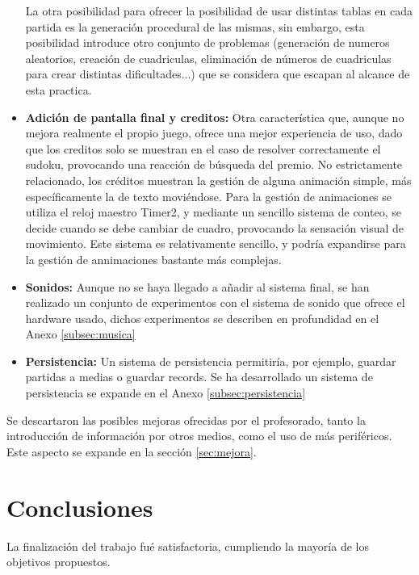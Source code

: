 \documentclass[12pt,letterpaper]{article}
\begin{document}
\begin{itemize}
    La otra posibilidad para ofrecer la posibilidad de usar distintas
    tablas en cada partida es la generación procedural de las mismas,
    sin embargo, esta posibilidad introduce otro conjunto de problemas
    (generación de numeros aleatorios, creación de cuadriculas,
    eliminación de números de cuadriculas para crear distintas
    dificultades...)  que se considera que escapan al alcance de esta
    practica.
  \item \textbf{Adición de pantalla final y creditos:} Otra
    característica que, aunque no mejora realmente el propio juego,
    ofrece una mejor experiencia de uso, dado que los creditos solo se
    muestran en el caso de resolver correctamente el sudoku,
    provocando una reacción de búsqueda del premio. No estrictamente
    relacionado, los créditos muestran la gestión de alguna animación
    simple, más específicamente la de texto moviéndose. Para la
    gestión de animaciones se utiliza el reloj maestro Timer2, y
    mediante un sencillo sistema de conteo, se decide cuando se debe
    cambiar de cuadro, provocando la sensación visual de movimiento.
    Este sistema es relativamente sencillo, y podría expandirse para
    la gestión de annimaciones bastante más complejas.
  \item \textbf{Sonidos:} Aunque no se haya llegado a añadir al
    sistema final, se han realizado un conjunto de experimentos con el
    sistema de sonido que ofrece el hardware usado, dichos
    experimentos se describen en profundidad en el Anexo
    \ref{subsec:musica}
  \item \textbf{Persistencia:} Un sistema de persistencia permitiría,
    por ejemplo, guardar partidas a medias o guardar records. Se ha
    desarrollado un sistema de persistencia se expande en el Anexo
    \ref{subsec:persistencia}
\end{itemize}

Se descartaron las posibles mejoras ofrecidas por el profesorado,
tanto la introducción de información por otros medios, como el uso de
más periféricos. Este aspecto se expande en la sección
\ref{sec:mejora}.
\section{Conclusiones}
La finalización del trabajo fué satisfactoria, cumpliendo la mayoría
de los objetivos propuestos.
\end{document}
